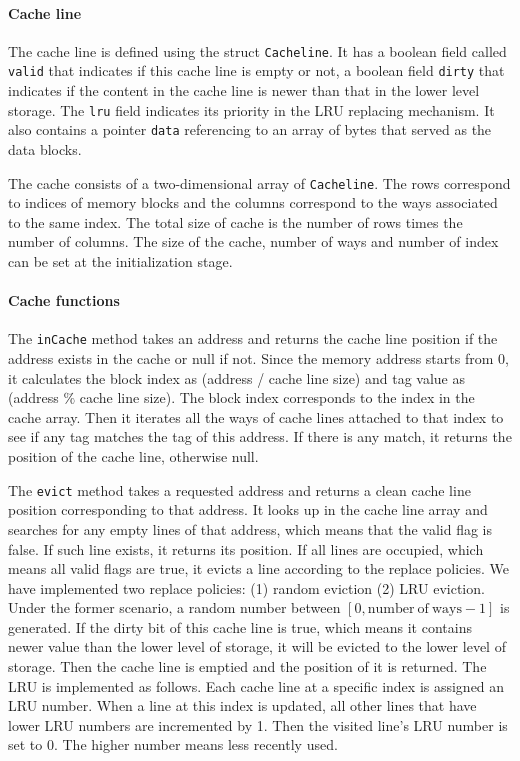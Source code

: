 \documentclass{sig-alternate}
\begin{document}
\paragraph{Cache line}
 The cache line is defined using the struct \texttt{Cacheline}. It has a boolean field called \texttt{valid} that indicates if this cache line is empty or not, a boolean field \texttt{dirty} that indicates if the content in the cache line is newer than that in the lower level storage. The \texttt{lru} field indicates its priority in the LRU replacing mechanism. It also contains a pointer \texttt{data} referencing to an array of bytes that served as the data blocks.

The cache consists of a two-dimensional array of \texttt{Cacheline}. The rows correspond to indices of memory blocks and the columns correspond to the ways associated to the same index. The total size of cache is the number of rows times the number of columns. The size of the cache, number of ways and number of index can be set at the initialization stage.

\paragraph{Cache functions}
The \texttt{inCache} method takes an address and returns the cache line position if the address exists in the cache or null if not. Since the memory address starts from 0, it calculates the block index as (address / cache line size) and tag value as (address $\%$ cache line size). The block index corresponds to the index in the cache array. Then it iterates all the ways of cache lines attached to that index to see if any tag matches the tag of this address. If there is any match, it returns the position of the cache line, otherwise null. 

The \texttt{evict} method takes a requested address and returns a clean cache line position corresponding to that address. It looks up in the cache line array and searches for any empty lines of that address, which means that the valid flag is false. If such line exists, it returns its position. If all lines are occupied, which means all valid flags are true, it evicts a line according to the replace policies. We have implemented two replace policies: (1) random eviction (2) LRU eviction. Under the former scenario, a random number between $[0, \mathrm{number\ of\ ways} - 1]$ is generated. If the dirty bit of this cache line is true, which means it contains newer value than the lower level of storage, it will be evicted to the lower level of storage. Then the cache line is emptied and the position of it is returned. The LRU is implemented as follows. Each cache line at a specific index is assigned an LRU number. When a line at this index is updated, all other lines that have lower LRU numbers are incremented by 1. Then the visited line's LRU number is set to 0. The higher number means less recently used. 
\end{document}
